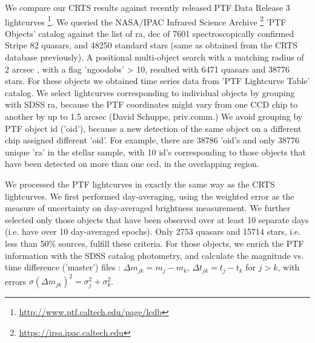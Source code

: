 \documentclass[fleqn,usenatbib]{mnras}  %
\begin{document}
We compare our CRTS results against recently released  PTF Data Release 3 lightcurves \footnote{\url{http://www.ptf.caltech.edu/page/lcdb}}. We queried the NASA/IPAC Infrared Science Archive \footnote{\url{https://irsa.ipac.caltech.edu}} 'PTF Objects' catalog against the list of ra, dec of 7601 spectroscopically confirmed Stripe 82 quasars, and 48250 standard stars (same as obtained from the CRTS database previously).  A positional multi-object search with a matching radius of 2 arcsec , with  a flag 'ngoodobs' > 10,  resulted with  6471 quasars and 38776 stars.  For these objects we obtained time series data from 'PTF Lightcurve Table' catalog.  We select lightcurves corresponding to individual objects by grouping with SDSS ra, because the PTF coordinates might vary from  one CCD chip to another by up to 1.5 arcsec (David Schuppe, priv.comm.)  We avoid grouping by PTF object id ('oid'), because a new detection of the same object on a different chip assigned different 'oid'. For example, there  are 38786 'oid's  and only 38776  unique 'ra'  in the stellar sample, with 10  id's  corresponding to those objects that  have been detected on more than one ccd, in the overlapping region. 

We processed the PTF lightcurves in exactly the same way as the CRTS lightcurves. We first performed day-averaging, using the weighted error as the measure of uncertainty on day-averaged  brightness measurement. We further selected only those objects that have been observed over at least 10 separate days (i.e. have over 10 day-averaged epochs). Only 2753 quasars and 15714 stars, i.e. less than 50\% sources, fulfill these criteria.  For those objects, we enrich the PTF information with the SDSS catalog photometry, and calculate the magnitude vs. time difference ('master') files : $\Delta m_{jk} = m_{j} - m_{k}$, $\Delta t_{jk} = t_{j} - t_{k}$ for $j>k$, with errors  $\sigma(\Delta m_{jk})^{2} = \sigma_{j}^{2} + \sigma_{k}^{2}$. 
\end{document}

